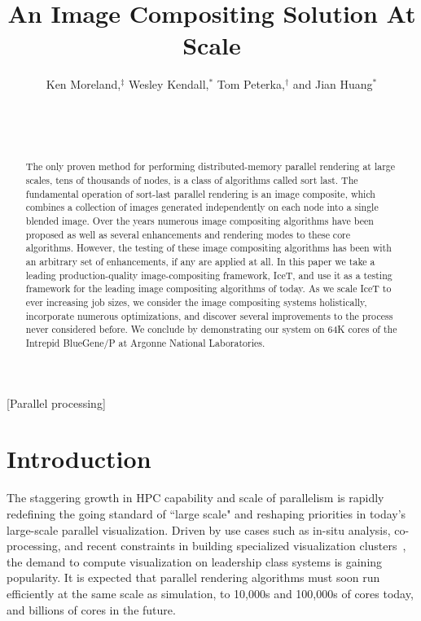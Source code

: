 \documentclass{sig-alternate}
\title{An Image Compositing Solution At Scale}
\author{
\alignauthor
Ken Moreland,$^{\ddagger}$ Wesley Kendall,$^{*}$ Tom Peterka,$^{\dagger}$ and Jian Huang$^{*}$\\
    \affaddr{$^\ddagger$Sandia National Laboratory}\\
    \affaddr{$^*$University of Tennessee, Knoxville}\\
    \affaddr{$^\dagger$Argonne National Laboratory}\\
}
\newcommand*{\lcite}[1]{~\cite{#1}}
\begin{document}
\sloppy

\maketitle

\begin{abstract}
  The only proven method for performing distributed-memory parallel
  rendering at large scales, tens of thousands of nodes, is a class of
  algorithms called sort last.  The fundamental operation of sort-last
  parallel rendering is an image composite, which combines a collection of
  images generated independently on each node into a single blended image.
  Over the years numerous image compositing algorithms have been proposed
  as well as several enhancements and rendering modes to these core
  algorithms.  However, the testing of these image compositing algorithms
  has been with an arbitrary set of enhancements, if any are applied at
  all.  In this paper we take a leading production-quality
  image-compositing framework, IceT, and use it as a testing framework for
  the leading image compositing algorithms of today.  As we scale IceT to
  ever increasing job sizes, we consider the image compositing systems
  holistically, incorporate numerous optimizations, and discover several
  improvements to the process never considered before.  We conclude by
  demonstrating our system on 64K cores of the Intrepid BlueGene/P at
  Argonne National Laboratories.
\end{abstract}


[Parallel processing]


\section{Introduction} 
\label{sec:Introduction}

The staggering growth in HPC capability and scale of parallelism is rapidly 
redefining the going standard of ``large scale" and reshaping priorities 
in today's large-scale parallel visualization.
Driven by use cases such as in-situ analysis, co-processing, and
recent constraints in building specialized visualization 
clusters\lcite{Childs2007}, the demand to compute visualization 
on leadership class systems is gaining popularity.
It is expected that parallel rendering algorithms must soon run efficiently 
at the same scale as simulation, to 10,000s and 100,000s of cores 
today, and billions of cores in the future.
\end{document}
